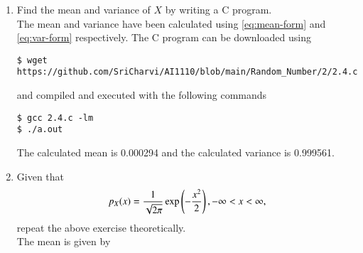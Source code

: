\documentclass[journal,12pt,twocolumn]{IEEEtran}
\renewcommand\thesection{\arabic{section}}
\begin{document}
\begin{enumerate}[label=\thesection.\arabic*
,ref=\thesection.\theenumi]
What properties does the PDF have?\\
\solution The PDF of $X$ is plotted in Fig. \ref{fig:gau_pdf} using the code below
\begin{lstlisting}
$ wget https://github.com/SriCharvi/AI1110/blob/main/Random_Number/2/2.3.py
\end{lstlisting}
The figure is generated using
\begin{lstlisting}
$ python3 2.3.py
\end{lstlisting}
The properties of a PDF $p_X(x)$ are as follows:
		\begin{enumerate}
			\item $\forall x \in \mathbb{R}$, $p_X(x) \geq 0$
			\item $\int_{-\infty}^{\infty}p_X(x)dx = 1$
			\item For $a < b$, $a, b \in \mathbb{R}$ 
				\begin{align}
					\pr{a < X < b} &= \pr{a \leq X \leq b} \\
					&= \int_{a}^{b}p_X(x)dx
				\end{align}
				If we take $a = b$, then we get $\pr{X = a} = 0$.
		\end{enumerate}
\begin{figure}
\centering
\texttt{[image: gau\_pdf.png]}
\caption{The PDF of $X$}
\label{fig:gau_pdf}
\end{figure}
\item Find the mean and variance of $X$ by writing a C program.\\
\solution
The mean and variance have been calculated using \eqref{eq:mean-form} and \eqref{eq:var-form} respectively.
\noindent The C program can be downloaded using
\begin{lstlisting}
$ wget https://github.com/SriCharvi/AI1110/blob/main/Random_Number/2/2.4.c
\end{lstlisting}
and compiled and executed with the following commands
\begin{lstlisting}
$ gcc 2.4.c -lm
$ ./a.out
\end{lstlisting}
The calculated mean is 0.000294 and the calculated variance is 0.999561.
\item Given that 
\begin{align}
p_{X}(x) = \frac{1}{\sqrt{2\pi}}\exp\left(-\frac{x^2}{2}\right), -\infty < x < \infty,
\end{align}
repeat the above exercise theoretically.\\
\solution
The mean is given by
		\begin{align}

\end{align}
\end{enumerate}
\end{document}
